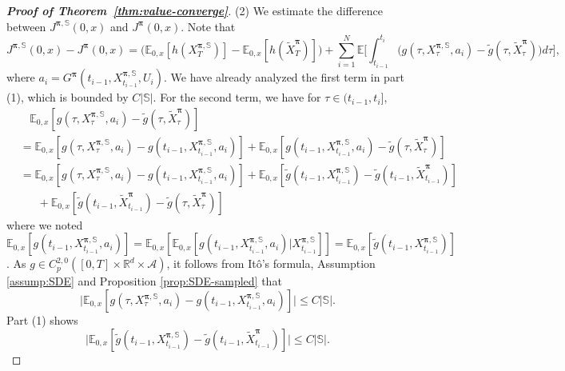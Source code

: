 \documentclass[11pt]{article}
\newcommand{\1}{\mathbbm{1}}
\newcommand{\bpi}{\boldsymbol{\pi}}
\begin{document}
\begin{proof}[\bf Proof of Theorem~\ref{thm:value-converge}]
\noindent (2) We estimate the difference between $J^{\bpi,\mathbb{S}}(0,x)$ and $J^{\bpi}(0,x)$. Note that
\begin{equation}
	J^{\bpi,\mathbb{S}}(0,x) - J^{\bpi}(0,x) = \big(\mathbb{E}_{0,x}[h(X_T^{\bpi,\mathbb{S}})] - \mathbb{E}_{0,x}[h(\tilde{X}_T^{\bpi})]\big) + \sum_{i=1}^N \mathbb{E}\Big[\int_{t_{i-1}}^{t_i} \big(g(\tau, X_\tau^{\bpi, \mathbb{S}}, a_i) - \tilde{g}(\tau, \tilde{X}_{\tau}^{\bpi})\big)d\tau\Big],
\end{equation}
where $a_i=G^{\bpi}(t_{i-1}, X^{\bpi, \mathbb{S}}_{t_{i-1}}, U_{i})$. We have already analyzed the first term in part (1), which is bounded by $C|\mathbb{S}|$. For the second term, we have for $\tau\in(t_{i-1},t_i]$,
\begin{align}
	&\phantom{~~~~}\mathbb{E}_{0,x}[g(\tau, X_\tau^{\bpi, \mathbb{S}}, a_i) - \tilde{g}(\tau, \tilde{X}_{\tau}^{\bpi})]\\
	&= \mathbb{E}_{0,x}[g(\tau, X_\tau^{\bpi, \mathbb{S}}, a_i) - g(t_{i-1}, X_{t_{i-1}}^{\bpi, \mathbb{S}}, a_i)] + \mathbb{E}_{0,x}[g(t_{i-1}, X_{t_{i-1}}^{\bpi, \mathbb{S}}, a_i) - \tilde{g}(\tau, \tilde{X}_{\tau}^{\bpi})]\\
	&= \mathbb{E}_{0,x}[g(\tau, X_\tau^{\bpi, \mathbb{S}}, a_i) - g(t_{i-1}, X_{t_{i-1}}^{\bpi, \mathbb{S}}, a_i)] + \mathbb{E}_{0,x}[\tilde{g}(t_{i-1}, X_{t_{i-1}}^{\bpi, \mathbb{S}}) - \tilde{g}(t_{i-1}, \tilde{X}_{t_{i-1}}^{\bpi})]\\
	&\phantom{=~}+ \mathbb{E}_{0,x}[\tilde{g}(t_{i-1}, \tilde{X}_{t_{i-1}}^{\bpi}) - \tilde{g}(\tau, \tilde{X}_{\tau}^{\bpi})]
\end{align}
where we noted $\mathbb{E}_{0,x}[g(t_{i-1}, X_{t_{i-1}}^{\bpi, \mathbb{S}}, a_i)]=\mathbb{E}_{0,x}[\mathbb{E}_{0,x}[g(t_{i-1}, X_{t_{i-1}}^{\bpi, \mathbb{S}}, a_i)|X_{t_{i-1}}^{\bpi, \mathbb{S}}]]=\mathbb{E}_{0,x}[\tilde{g}(t_{i-1}, X_{t_{i-1}}^{\bpi, \mathbb{S}})]$. As $g\in C^{2,0}_p([0,T]\times\mathbb{R}^d\times\mathcal{A})$, it follows from It\^o's formula, Assumption \ref{assump:SDE} and Proposition \ref{prop:SDE-sampled} that
\begin{equation}
	\big|\mathbb{E}_{0,x}[g(\tau, X_\tau^{\bpi, \mathbb{S}}, a_i) - g(t_{i-1}, X_{t_{i-1}}^{\bpi, \mathbb{S}}, a_i)]\big| \leq C|\mathbb{S}|.
\end{equation}
Part (1) shows
\begin{equation}
	\big|\mathbb{E}_{0,x}[\tilde{g}(t_{i-1}, X_{t_{i-1}}^{\bpi, \mathbb{S}}) - \tilde{g}(t_{i-1}, \tilde{X}_{t_{i-1}}^{\bpi})]\big| \leq C|\mathbb{S}|.
\end{equation}

\end{proof}
\end{document}
